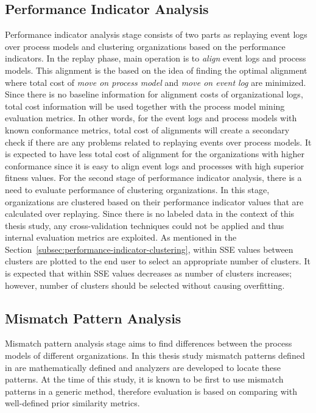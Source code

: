 \subsection{Performance Indicator Analysis}
\label{subsec:performance-indicator-analysis-eval}
Performance indicator analysis stage consists of two parts as replaying event logs over process models and clustering organizations based on the performance indicators. In the replay phase, main operation is to \textit{align} \cite{van2012replaying} event logs and process models. This alignment is the based on the idea of finding the optimal alignment where total cost of \textit{move on process model} and \textit{move on event log} are minimized. Since there is no baseline information for alignment costs of organizational logs, total cost information will be used together with the process model mining evaluation metrics. In other words, for the event logs and process models with known conformance metrics, total cost of alignments will create a secondary check if there are any problems related to replaying events over process models. It is expected to have less total cost of alignment for the organizations with higher conformance since it is easy to align event logs and processes with high superior fitness values.
For the second stage of performance indicator analysis, there is a need to evaluate performance of clustering organizations. In this stage, organizations are clustered  based on their performance indicator values that are calculated over replaying. Since there is no labeled data in the context of this thesis study, any cross-validation techniques could not be applied and thus internal evaluation metrics are exploited. As mentioned in the Section~\ref{subsec:performance-indicator-clustering}, within SSE values between clusters are plotted to the end user to select an appropriate number of clusters. It is expected that within SSE values decreases as number of clusters increases; however, number of clusters should be selected without causing overfitting.

\subsection{Mismatch Pattern Analysis}
\label{subsec:mismatch-pattern-analysis-eval}
Mismatch pattern analysis stage aims to find differences between the process models of different organizations. In this thesis study mismatch patterns defined in \cite{dijkman2007mismatch} are mathematically defined and analyzers are developed to locate these patterns. At the time of this study, it is known to be first to use mismatch patterns in a generic method, therefore evaluation is based on comparing with well-defined prior similarity metrics.

